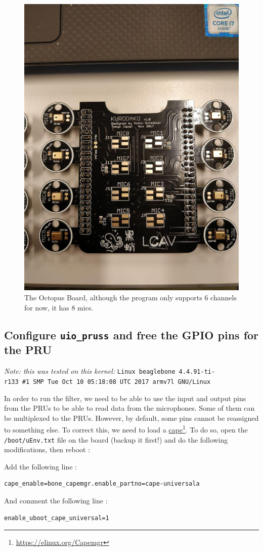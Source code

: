 \documentclass[]{report}
\begin{document}
\begin{figure}[h]
\centering
\includegraphics[width=0.4\linewidth]{Pictures/kurodako.jpg}
\caption{The Octopus Board, although the program only supports 6
channels for now, it has 8 mics.}
\end{figure}

\hypertarget{configure-uio_pruss-and-free-the-gpio-pins-for-the-pru}{%
\subsection{\texorpdfstring{Configure \texttt{uio\_pruss} and free
the GPIO pins for the
PRU}{Configure uio\_pruss and free the GPIO pins for the PRU}}\label{configure-uio_pruss-and-free-the-gpio-pins-for-the-pru}}

\emph{Note: this was tested on this kernel:}
\texttt{Linux beaglebone\ 4.4.91-ti-r133\ \#1\ SMP\ Tue\ Oct\ 10\ 05:18:08\ UTC\ 2017\ armv7l\ GNU/Linux}

In order to run the filter, we need to be able to use the input and
output pins from the PRUs to be able to read data from the microphones.
Some of them can be multiplexed to the PRUs. However, by default, some
pins cannot be reassigned to something else. To correct this, we need to
load a \href{https://elinux.org/Capemgr}{cape}\footnote{\url{https://elinux.org/Capemgr}}. To do so, open the
\texttt{/boot/uEnv.txt} file on the board (backup it first!) and do the
following modifications, then reboot :

Add the following line :

\begin{verbatim}
cape_enable=bone_capemgr.enable_partno=cape-universala
\end{verbatim}

And comment the following line :

\begin{verbatim}
enable_uboot_cape_universal=1
\end{verbatim}
\end{document}
